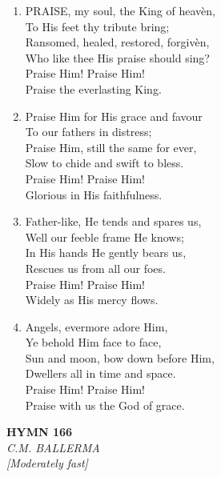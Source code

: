 \begin{enumerate}
    \item PRAISE, my soul, the King of heav\`en, \\
        To His feet thy tribute bring; \\
        Ransomed, healed, restored, forgiv\`en, \\
        Who like thee His praise should sing? \\
        Praise Him! Praise Him! \\
        Praise the everlasting King.

    \item Praise Him for His grace and favour \\
        To our fathers in distress; \\
        Praise Him, still the same for ever, \\
        Slow to chide and swift to bless. \\
        Praise Him! Praise Him! \\
        Glorious in His faithfulness.

    \item Father-like, He tends and spares us, \\
        Well our feeble frame He knows; \\
        In His hands He gently bears us, \\
        Rescues us from all our foes. \\
        Praise Him! Praise Him! \\
        Widely as His mercy flows.

    \item Angels, evermore adore Him, \\
        Ye behold Him face to face, \\
        Sun and moon, bow down before Him, \\
        Dwellers all in time and space. \\
        Praise Him! Praise Him! \\
        Praise with us the God of grace.

\end{enumerate}

\newpage
\begin{center}
    {\Large \textbf{HYMN 166}}
    \\
    \textit{C.M. BALLERMA}
    \\
    \textit{\small [Moderately fast]}
\end{center}
\vspace{1em}

